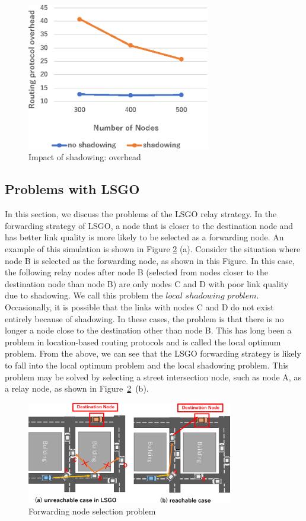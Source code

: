 \documentclass[conference]{IEEEtran}
\begin{document}
\begin{figure}[!ht]
\centering
\includegraphics[width=80mm]{figures/LSGO_overhead.eps}
\caption{Impact of shadowing: overhead}
\label{fig:LSGO-overhead}
\end{figure}

\subsection{Problems with LSGO}

In this section, we discuss the problems of the LSGO relay strategy.  
In the forwarding strategy of LSGO, a node that is closer to the destination node and has better link quality is more likely to be selected as a forwarding node. 
An example of this simulation is shown in Figure \ref{fig:LSGO-route} (a). 
Consider the situation where node B is selected as the forwarding node, as shown in this Figure. 
In this case, the following relay nodes after node B (selected from nodes closer to the destination node than node B) are only nodes C and D with poor link quality due to shadowing.  
We call this problem the $local$ $shadowing$ $problem$. 
Occasionally, it is possible  that the links with nodes C and D do not exist entirely  because of  shadowing. 
In these cases, the problem is that there is no longer a node close to the destination other than  node B. 
This has long been a problem in  location-based routing protocols and is called the local optimum problem. 
From the above, we can see that the LSGO forwarding strategy is likely to fall into the local optimum problem and the local shadowing problem. This problem may be solved by selecting a street intersection node, such as node A, as a relay node, as shown in \mbox{Figure \ref{fig:LSGO-route} (b)}. 




\begin{figure}[!ht]
\centering
\includegraphics[width=90mm]{figures/efficient_route.eps}
\caption{Forwarding node selection problem}
\label{fig:LSGO-route}
\end{figure}
\end{document}
